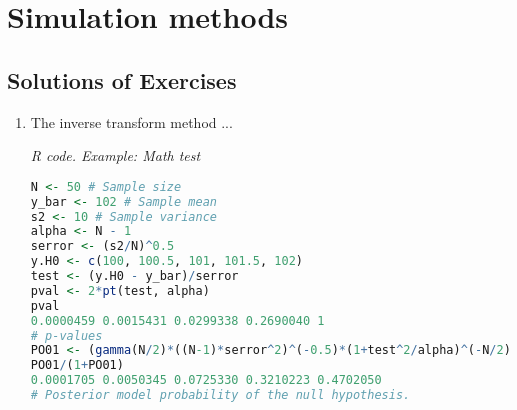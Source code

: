 \chapter{Simulation methods}\label{chap5}

\section{Solutions of Exercises}\label{sec51}
\begin{enumerate}[leftmargin=*]
\item The inverse transform method ...


\begin{tcolorbox}[enhanced,width=4.67in,center upper,
	fontupper=\large\bfseries,drop shadow southwest,sharp corners]
	\textit{R code. Example: Math test}
\begin{VF}
\begin{lstlisting}[language=R]
N <- 50 # Sample size
y_bar <- 102 # Sample mean 
s2 <- 10 # Sample variance
alpha <- N - 1
serror <- (s2/N)^0.5 
y.H0 <- c(100, 100.5, 101, 101.5, 102)
test <- (y.H0 - y_bar)/serror
pval <- 2*pt(test, alpha)
pval
0.0000459 0.0015431 0.0299338 0.2690040 1
# p-values
PO01 <- (gamma(N/2)*((N-1)*serror^2)^(-0.5)*(1+test^2/alpha)^(-N/2))/(gamma(1/2)*gamma((N-1)/2))
PO01/(1+PO01)
0.0001705 0.0050345 0.0725330 0.3210223 0.4702050
# Posterior model probability of the null hypothesis.
\end{lstlisting}
\end{VF}
\end{tcolorbox}
\end{enumerate}